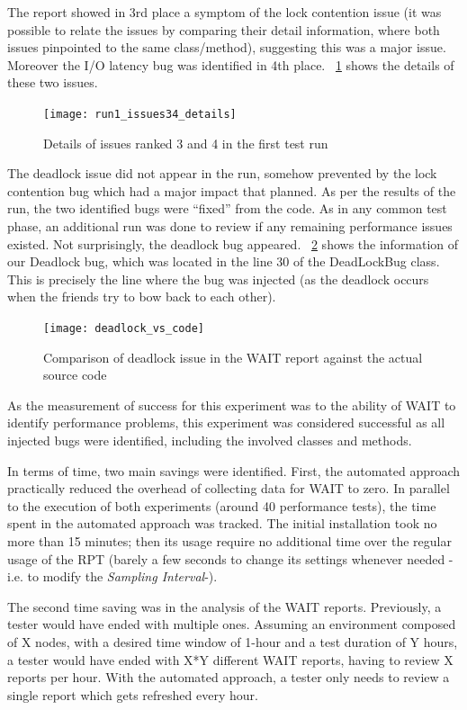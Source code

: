 \documentclass[runningheads,a4paper]{llncs}
\begin{document}
The report showed in 3rd place a symptom of the lock contention issue
(it was possible to relate the issues by comparing their detail information,
where both issues pinpointed to the same class/method), suggesting this was a
major issue. Moreover the I/O latency bug was identified in 4th place.
\figurename ~\ref{fig_issues34} shows the details of these two issues.

\begin{figure}[!h]
\texttt{[image: run1\_issues34\_details]}
\caption{Details of issues ranked 3 and 4 in the first test run}
\label{fig_issues34}
\end{figure}

The deadlock issue did not appear in the run, somehow prevented by the lock
contention bug which had a major impact that planned. As per the results of
the run, the two identified bugs were ``fixed'' from the code. As in any common
test phase, an additional run was done to review if any remaining
performance issues existed. Not surprisingly, the deadlock bug
appeared. \figurename ~\ref{fig_dlissue_vs_code} shows the information of our
Deadlock bug, which was located in the line 30 of the DeadLockBug class. This is
precisely the line where the bug was injected (as the deadlock occurs when
the friends try to bow back to each other).

\begin{figure}[!h]
\texttt{[image: deadlock\_vs\_code]}
\caption{Comparison of deadlock issue in the WAIT report against the
actual source code}
\label{fig_dlissue_vs_code}
\end{figure}

As the measurement of success for this experiment was to the ability of WAIT to
identify performance problems, this experiment was considered successful as all
injected bugs were identified, including the involved classes and methods.

In terms of time, two main savings were identified. First, the automated
approach practically reduced the overhead of collecting data for WAIT to zero.
In parallel to the execution of both experiments (around 40 performance tests),
the time spent in the automated approach was tracked. The initial installation
took no more than 15 minutes; then its usage require no additional time over the
regular usage of the RPT (barely a few seconds to change its settings whenever
needed -i.e. to modify the \emph{Sampling Interval}-). 

The second time saving was in the analysis of the WAIT reports. Previously, a
tester would have ended with multiple ones. Assuming an environment composed of
X nodes, with a desired time window of 1-hour and a test duration of Y hours, a
tester would have ended with X*Y different WAIT reports, having to review X
reports per hour. With the automated approach, a tester only needs to review a
single report which gets refreshed every hour.
\end{document}
